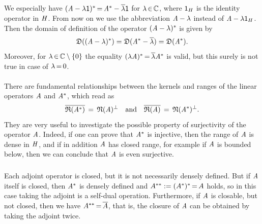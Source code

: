 \documentclass[11pt,twoside]{article}
\begin{document}
\subparagraph*{}
We especially have
$(\mathit{A} - \lambda {\mathsf{1}})^* {\,=\,} \mathit{A}^* - \overline{\lambda} {\mathsf{1}}$
for $\lambda {\,\in\,} {\mathbb{C}}$,
where ${\mathsf{1}}_H$ is the identity operator in $\mathit{H}$.
From now on we use the abbreviation $\mathit{A}-\lambda$
instead of $\mathit{A}-\lambda {\mathsf{1}}_H$.
Then the domain of definition of the operator $(\mathit{A} - \lambda)^*$ is given by
\[
\mathfrak{D}((\mathit{A}  - \lambda)^*) =
\mathfrak{D}(\mathit{A}^* - \overline{\lambda}) =
\mathfrak{D}(\mathit{A}^*).
\]
Moreover,
for $\lambda {\,\in\,} {\mathbb{C}} \setminus \{0\}$ the equality
$(\lambda \mathit{A})^* {\,=\,} \overline{\lambda} \mathit{A}^*$ is valid,
but this surely is not true in case of $\lambda {\,=\,} 0$.

\paragraph*{}
There are fundamental relationships between the kernels and ranges
of the linear operators $\mathit{A}$ and $\mathit{A}^*$,
which read as
\begin{equation}\label{ORTHOGONALITY_RELATIONS}
\overline{\mathfrak{R}(\mathit{A}^*) } \,=\, \mathfrak{N}(\mathit{A})^{\bot}
\quad \mbox{and} \quad
\overline{\mathfrak{R}(\mathit{A}) } \,=\, \mathfrak{N}(\mathit{A}^*)^{\bot}.
\end{equation}
They are very useful
to investigate the possible property of surjectivity of the operator $\mathit{A}$.
Indeed,
if one can prove that $\mathit{A}^*$ is injective,
then the range of $\mathit{A}$ is dense in $\mathit{H}$,
and if in addition $\mathit{A}$ has closed range,
for example if $\mathit{A}$ is bounded below,
then we can conclude that $\mathit{A}$ is even surjective.

\subparagraph*{}
Each adjoint operator is closed,
but it is not necessarily densely defined.
But if $\mathit{A}$ itself is closed,
then $\mathit{A}^*$ is densely defined and $A^{**} := (A^*)^* {\,=\,} A$ holds,
so in this case taking the adjoint is a self-dual operation.
Furthermore,
if $\mathit{A}$ is closable,
but not closed,
then we have $A^{**} {\,=\,} \overline{A}$,
that is,
the closure of $\mathit{A}$ can be obtained by taking the adjoint twice.
\end{document}

